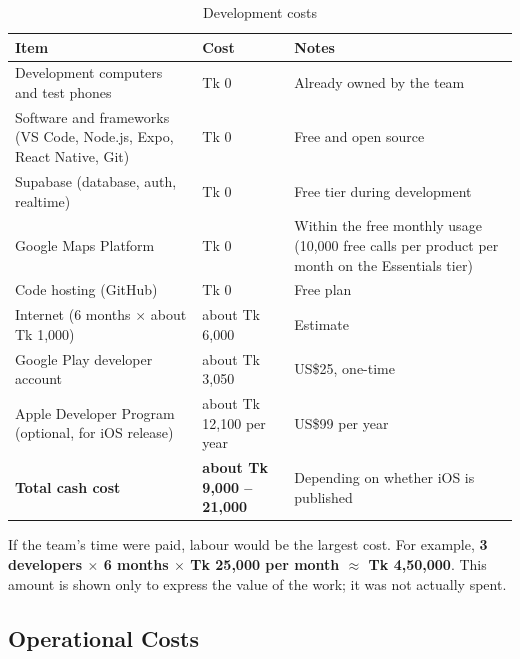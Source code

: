 \begin{table}[H]
  \centering
  \small
  \caption{Development costs}
  \label{tab:dev-costs}
  \begin{tabularx}{\textwidth}{@{}Lp{3cm}L@{}}
    \toprule
    \textbf{Item} & \textbf{Cost} & \textbf{Notes} \\
    \midrule
    Development computers and test phones & Tk 0 & Already owned by the team \\
    Software and frameworks (VS Code, Node.js, Expo, React Native, Git) & Tk 0 & Free and open source \\
    Supabase (database, auth, realtime) & Tk 0 & Free tier during development \\
    Google Maps Platform & Tk 0 & Within the free monthly usage (10,000 free calls per product per month on the Essentials tier)~\cite{gmaps_free} \\
    Code hosting (GitHub) & Tk 0 & Free plan \\
    Internet (6 months $\times$ about Tk 1,000) & about Tk 6,000 & Estimate \\
    Google Play developer account & about Tk 3,050 & US\$25, one-time \\
    Apple Developer Program (optional, for iOS release) & about Tk 12,100 per year & US\$99 per year \\
    \midrule
    \textbf{Total cash cost} & \textbf{about Tk 9,000 -- 21,000} & Depending on whether iOS is published \\
    \bottomrule
  \end{tabularx}
\end{table}

If the team's time were paid, labour would be the largest cost. For example,
\textbf{3 developers $\times$ 6 months $\times$ Tk 25,000 per month
$\approx$ Tk 4,50,000}. This amount is shown only to express the value of the
work; it was not actually spent.

\subsection{Operational Costs}
\label{subsec:op-costs}

